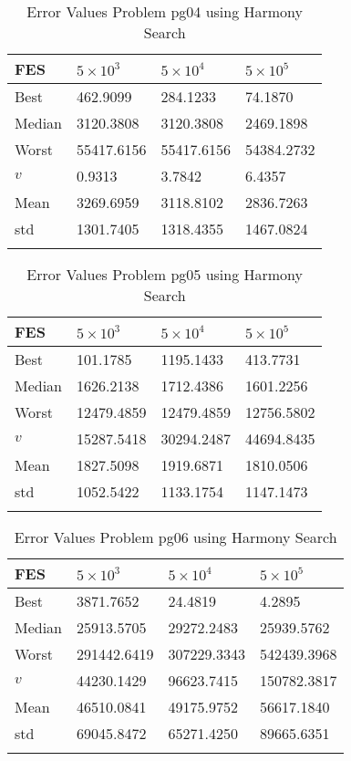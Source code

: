 \documentclass[10pt, a4paper]{book}
\begin{document}
\begin{center}
\begin{longtable}{l l l l}
FES & $5 \times 10^{3}$ & $5 \times 10^{4}$ & $5 \times 10^{5}$ \\
\hline
Best & 462.9099 & 284.1233 & 74.1870 \\
Median & 3120.3808 & 3120.3808 & 2469.1898 \\
Worst & 55417.6156 & 55417.6156 & 54384.2732 \\
$v$ & 0.9313 & 3.7842 & 6.4357 \\
Mean & 3269.6959 & 3118.8102 & 2836.7263 \\
std & 1301.7405 & 1318.4355 & 1467.0824 \\
\caption{ Error Values Problem pg04 using Harmony Search }
\end{longtable}
\end{center}

\begin{center}
\begin{longtable}{l l l l}
FES & $5 \times 10^{3}$ & $5 \times 10^{4}$ & $5 \times 10^{5}$ \\
\hline
Best & 101.1785 & 1195.1433 & 413.7731 \\
Median & 1626.2138 & 1712.4386 & 1601.2256 \\
Worst & 12479.4859 & 12479.4859 & 12756.5802 \\
$v$ & 15287.5418 & 30294.2487 & 44694.8435 \\
Mean & 1827.5098 & 1919.6871 & 1810.0506 \\
std & 1052.5422 & 1133.1754 & 1147.1473 \\
\caption{ Error Values Problem pg05 using Harmony Search }
\end{longtable}
\end{center}

\begin{center}
\begin{longtable}{l l l l}
FES & $5 \times 10^{3}$ & $5 \times 10^{4}$ & $5 \times 10^{5}$ \\
\hline
Best & 3871.7652 & 24.4819 & 4.2895 \\
Median & 25913.5705 & 29272.2483 & 25939.5762 \\
Worst & 291442.6419 & 307229.3343 & 542439.3968 \\
$v$ & 44230.1429 & 96623.7415 & 150782.3817 \\
Mean & 46510.0841 & 49175.9752 & 56617.1840 \\
std & 69045.8472 & 65271.4250 & 89665.6351 \\
\caption{ Error Values Problem pg06 using Harmony Search }
\end{longtable}
\end{center}
\end{document}
